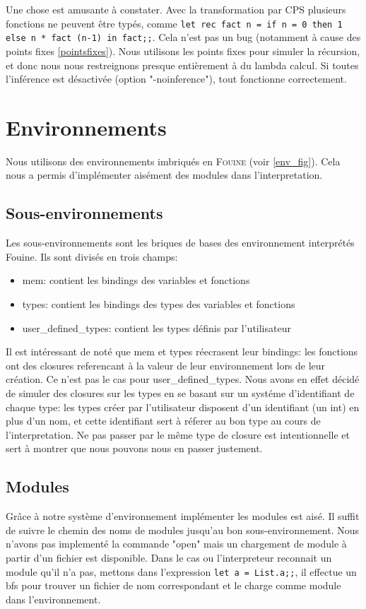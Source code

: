 \documentclass[paper=a4, fontsize=11pt, twocolumn]{article}
\begin{document}
Une chose est amusante à constater. Avec la transformation par CPS plusieurs fonctions ne peuvent être typés, comme \texttt{let rec fact n = if n = 0 then 1 else n * fact (n-1) in fact;;}. Cela n'est pas un bug (notamment à cause des points fixes \ref{pointsfixes}). Nous utilisons les points fixes pour simuler la récursion, et donc nous nous restreignons presque entièrement à du lambda calcul. Si toutes l'inférence est désactivée (option "-noinference"), tout fonctionne correctement.

\section{Environnements}
Nous utilisons des environnements imbriqués en \textsc{Fouine} (voir \ref{env_fig}). Cela nous a permis d'implémenter aisément des modules dans l'interpretation.

\subsection{Sous-environnements}
Les sous-environnements sont les briques de bases des environnement interprétés Fouine. Ils sont divisés en trois champs:
\begin{itemize}
	\item mem: contient les bindings des variables et fonctions
	\item types: contient les bindings des types des variables et fonctions
	\item user\_defined\_types: contient les types définis par l'utilisateur
\end{itemize}

Il est intéressant de noté que mem et types réecrasent leur bindings: les fonctions ont des closures referencant à la valeur de leur environnement lors de leur création. Ce n'est pas le cas pour user\_defined\_types. Nous avons en effet décidé de simuler des closures sur les types en se basant sur un systéme d'identifiant de chaque type: les types créer par l'utilisateur disposent d'un identifiant (un int) en plus d'un nom, et cette identifiant sert à réferer au bon type au cours de l'interpretation. Ne pas passer par le même type de closure est intentionnelle et sert à montrer que nous pouvons nous en passer justement.

\subsection{Modules}
Grâce à notre système d'environnement implémenter les modules est aisé. Il suffit de suivre le chemin des noms de modules jusqu'au bon sous-environnement. 
Nous n'avons pas implementé la commande "open" mais un chargement de module à partir d'un fichier est disponible. Dans le cas ou l'interpreteur reconnait un module qu'il n'a pas, mettons dans l'expression \texttt{let a = List.a;;}, il effectue un bfs pour trouver un fichier de nom correspondant et le charge comme module dans l'environnement.
\end{document}
